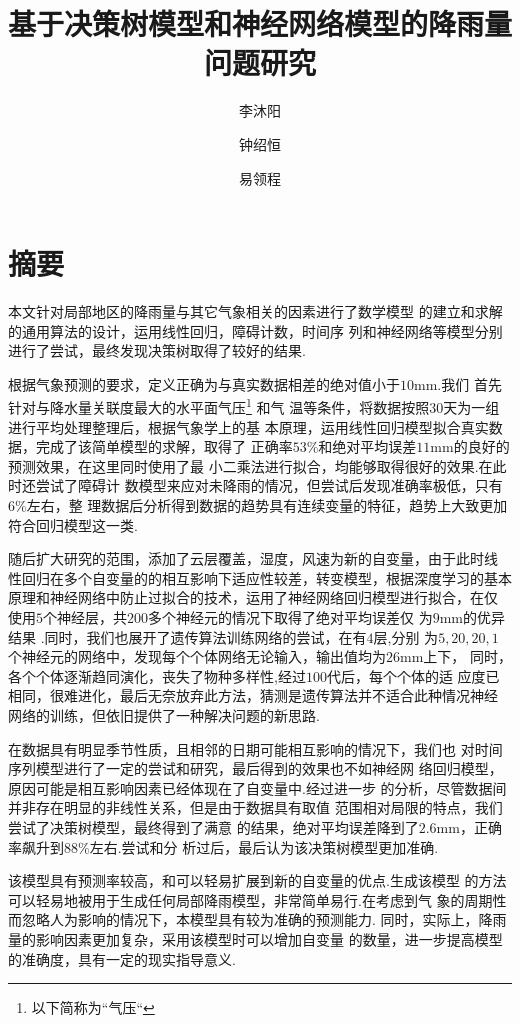 \documentclass[UTF8, a4paper]{ctexart}
\title{基于决策树模型和神经网络模型的降雨量问题研究}
\author{李沐阳 \and 钟绍恒 \and 易领程}
\begin{document}
\maketitle



\section{摘要}

本文针对局部地区的降雨量与其它气象相关的因素进行了数学模型
的建立和求解的通用算法的设计，运用线性回归，障碍计数，时间序
列和神经网络等模型分别进行了尝试，最终发现决策树取得了较好的结果.

根据气象预测的要求，定义正确为与真实数据相差的绝对值小于$10$\si{\milli\meter}.我们
首先针对与降水量关联度最大的水平面气压\footnote{以下简称为``气压``} 和气
温等条件，将数据按照$30$天为一组进行平均处理整理后，根据气象学上的基
本原理，运用线性回归模型拟合真实数据，完成了该简单模型的求解，取得了
正确率$53 \%$和绝对平均误差$11$mm的良好的预测效果，在这里同时使用了最
小二乘法进行拟合，均能够取得很好的效果.在此时还尝试了障碍计
数模型来应对未降雨的情况，但尝试后发现准确率极低，只有$6\%$左右，整
理数据后分析得到数据的趋势具有连续变量的特征，趋势上大致更加符合回归模型这一类.

随后扩大研究的范围，添加了云层覆盖，湿度，风速为新的自变量，由于此时线
性回归在多个自变量的的相互影响下适应性较差，转变模型，根据深度学习的基本
原理和神经网络中防止过拟合的技术，运用了神经网络回归模型进行拟合，在仅
使用$5$个神经层，共$200$多个神经元的情况下取得了绝对平均误差仅
为$9$\si{\milli\meter}的优异结果 .同时，我们也展开了遗传算法训练网络的尝试，在有$4$层,分别
为$5,20,20,1$个神经元的网络中，发现每个个体网络无论输入，输出值均为$26$\si{\milli\meter}上下，
同时，各个个体逐渐趋同演化，丧失了物种多样性,经过$100$代后，每个个体的适
应度已相同，很难进化，最后无奈放弃此方法，猜测是遗传算法并不适合此种情况神经
网络的训练，但依旧提供了一种解决问题的新思路.

在数据具有明显季节性质，且相邻的日期可能相互影响的情况下，我们也
对时间序列模型进行了一定的尝试和研究，最后得到的效果也不如神经网
络回归模型，原因可能是相互影响因素已经体现在了自变量中.经过进一步
的分析，尽管数据间并非存在明显的非线性关系，但是由于数据具有取值
范围相对局限的特点，我们尝试了决策树模型，最终得到了满意
的结果，绝对平均误差降到了$2.6$mm，正确率飙升到$88\%$左右.尝试和分
析过后，最后认为该决策树模型更加准确.

该模型具有预测率较高，和可以轻易扩展到新的自变量的优点.生成该模型
的方法可以轻易地被用于生成任何局部降雨模型，非常简单易行.在考虑到气
象的周期性而忽略人为影响的情况下，本模型具有较为准确的预测能力.
同时，实际上，降雨量的影响因素更加复杂，采用该模型时可以增加自变量
的数量，进一步提高模型的准确度，具有一定的现实指导意义.
\end{document}
